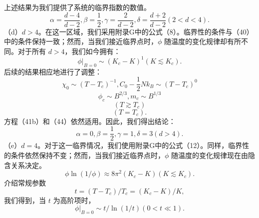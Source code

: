 上述结果为我们提供了系统的临界指数的数值。
\begin{equation}\tag{13.4.78}\label{eq:13.4.78}
\alpha = \frac { d - 4 } { d - 2 } ,  \beta = \frac { 1 } { 2 } ,  \gamma = \frac { 2 } { d - 2 } ,  \delta = \frac { d + 2 } { d - 2 }  ( 2 < d < 4 ) .
\end{equation}
（d）\(d>4\)。在这一区域，我们采用附录G中的公式（8）。临界性的条件与（40）中的条件保持一致；然而，当我们接近临界点时，\(\phi\) 随温度的变化规律却有所不同。对于所有 \(d>4\)，我们如今拥有：
\begin{equation}\tag{13.4.79}\label{eq:13.4.79}
\phi | _ { B = 0 } \sim ( K _ { c } - K ) ^{1}  ( K \lesssim K _ { c } ) .
\end{equation}
后续的结果相应地进行了调整：
\begin{equation}\tag{13.4.80}\label{eq:13.4.80}
\chi _ { 0 } \sim ( T - T _ { c } ) ^{- 1} ,  C _ { 0 } - \frac { 1 } { 2 } N k _ { B } \sim ( T - T _ { c } ) ^{0}
\end{equation}
\begin{equation}\tag{13.4.81}\label{eq:13.4.81}
\phi _ { c } \sim B ^{2 / 3} ,  m _ { c } \sim B ^{1 / 3}
\end{equation}
\begin{equation}\tag{13.4.82}\label{eq:13.4.82}
( T \gtrsim T _ { c } )
\end{equation}
\begin{equation}\tag{13.4.83}\label{eq:13.4.83}
( T = T _ { c } ) .
\end{equation}
方程（41b）和（44）依然适用。因此，我们得出结论：
\begin{equation}\tag{13.4.84}\label{eq:13.4.84}
\alpha = 0 ,  \beta = \frac { 1 } { 2 } ,  \gamma = 1 ,  \delta = 3  ( d > 4 ) .
\end{equation}
（e）\(d=4\)。对于这一临界情况，我们使用附录G中的公式（12）。同样，临界性的条件依然保持不变；然而，当我们接近临界点时，\(\phi\) 随温度的变化规律现在由隐含关系决定。
\begin{equation}\tag{13.4.85}\label{eq:13.4.85}
\phi \ln ( 1 / \phi ) \approx 8 \pi ^{2} ( K _ { c } - K )  ( K \lesssim K _ { c } ) .
\end{equation}
介绍常规参数
\begin{equation}\tag{13.4.86}\label{eq:13.4.86}
t = ( T - T _ { c } ) / T _ { c } = ( K _ { c } - K ) / K ,
\end{equation}
我们得到，当 \(t\) 为高阶项时，
\begin{equation}\tag{13.4.87}\label{eq:13.4.87}
\phi | _ { B = 0 } \sim t / \ln ( 1 / t )  ( 0 < t \ll 1 ) .
\end{equation}
